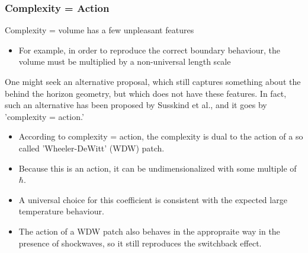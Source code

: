 \documentclass[8pt,aspectratio=169]{beamer}
\begin{document}
\begin{frame}
\frametitle{Complexity = Action}

Complexity = volume has a few unpleasant features

\begin{itemize}

\item For example, in order to reproduce the correct boundary behaviour, the volume must be multiplied by a non-universal length scale

\end{itemize}

One might seek an alternative proposal, which still captures something about the behind the horizon geometry, but which does not have these features. In fact, such an alternative has been proposed by Susskind et al., and it goes by 'complexity = action.'

\begin{itemize}

\item According to complexity = action, the complexity is dual to the action of a so called 'Wheeler-DeWitt' (WDW) patch.

\item Because this is an action, it can be undimensionalized with some multiple of $\hbar$. 

\item A universal choice for this coefficient is consistent with the expected large temperature behaviour. 

\item The action of a WDW patch also behaves in the appropraite way in the presence of shockwaves, so it still reproduces the switchback effect.

\end{itemize}

\end{frame}
\end{document}
